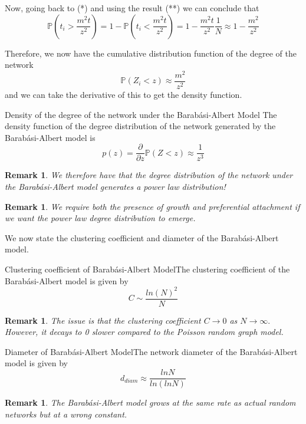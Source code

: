 \documentclass[twoside]{article}
\newcommand{\prob}{\mathbb{P}}
\newtheorem{remark}[theorem]{Remark}
\begin{document}
Now, going back to (*) and using the result (**) we can conclude that 
$$
\prob(t_i > \frac{m^2t}{z^2}) = 1 - \prob(t_i < \frac{m^2t}{z^2}) = 1 - \frac{m^2t}{z^2}\frac{1}{N} \approx 1 - \frac{m^2}{z^2}
$$

Therefore, we now have the cumulative distribution function of the degree of the network 
$$
\prob(Z_i < z) \approx \frac{m^2}{z^2}
$$
and we can take the derivative of this to get the density function.

\begin{proposition_exam}{Density of the degree of the network under the Barabási-Albert Model}{} The density function of the degree distribution of the network generated by the Barabási-Albert model is 
$$
p(z) = \frac{\partial}{\partial z}\prob(Z < z) \approx \frac{1}{z^3}
$$
\end{proposition_exam}


\begin{remark} We therefore have that the degree distribution of the network under the Barabási-Albert model generates a power law distribution!
\end{remark}


\begin{remark}We require both the presence of growth and preferential attachment if we want the power law degree distribution to emerge.
\end{remark}

We now state the clustering coefficient and diameter of the Barabási-Albert model.
\begin{proposition_exam}{Clustering coefficient of Barabási-Albert Model}{}The clustering coefficient of the Barabási-Albert model is given by 
$$
C \sim \frac{ln(N)^2}{N}
$$
\end{proposition_exam}
\begin{remark} The issue is that the clustering coefficient $C \rightarrow 0$ as $N \rightarrow \infty.$ However, it decays to 0 slower compared to the Poisson random graph model.
\end{remark}

\begin{proposition_exam}{Diameter of Barabási-Albert Model}{}The network diameter of the Barabási-Albert model is given by 
$$
d_{diam} \approx \frac{ln N}{ln (ln N)}
$$
\end{proposition_exam}
\begin{remark}The Barabási-Albert model grows at the same rate as actual random networks but at a wrong constant.
\end{remark}
\end{document}
